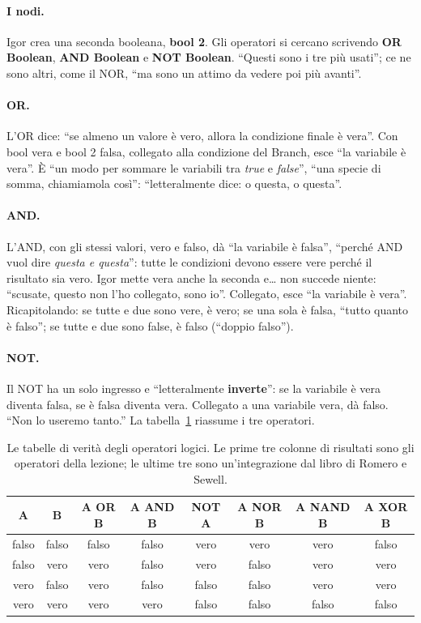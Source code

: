 \paragraph{I nodi.} Igor crea una seconda booleana, \textbf{bool 2}. Gli operatori si
cercano scrivendo \textbf{OR Boolean}, \textbf{AND Boolean} e \textbf{NOT Boolean}.
``Questi sono i tre più usati''; ce ne sono altri, come il NOR, ``ma sono un attimo da
vedere poi più avanti''.

\paragraph{OR.} L'OR dice: ``se almeno un valore è vero, allora la condizione finale è
vera''. Con bool vera e bool 2 falsa, collegato alla condizione del Branch, esce ``la
variabile è vera''. È ``un modo per sommare le variabili tra \emph{true} e \emph{false}'',
``una specie di somma, chiamiamola così'': ``letteralmente dice: o questa, o questa''.

\paragraph{AND.} L'AND, con gli stessi valori, vero e falso, dà ``la variabile è falsa'',
``perché AND vuol dire \emph{questa e questa}'': tutte le condizioni devono essere vere
perché il risultato sia vero. Igor mette vera anche la seconda e\ldots{} non succede
niente: ``scusate, questo non l'ho collegato, sono io''. Collegato, esce ``la variabile è
vera''. Ricapitolando: se tutte e due sono vere, è vero; se una sola è falsa, ``tutto
quanto è falso''; se tutte e due sono false, è falso (``doppio falso'').

\paragraph{NOT.} Il NOT ha un solo ingresso e ``letteralmente \textbf{inverte}'': se la
variabile è vera diventa falsa, se è falsa diventa vera. Collegato a una variabile vera,
dà falso. ``Non lo useremo tanto.'' La tabella~\ref{ue2:tab:logici} riassume i tre
operatori.

\begin{table}[htbp]
\centering
\small
\begin{tabular}{@{}cc|ccc|ccc@{}}
\toprule
\textbf{A} & \textbf{B} & \textbf{A OR B} & \textbf{A AND B} & \textbf{NOT A} &
  \textbf{A NOR B} & \textbf{A NAND B} & \textbf{A XOR B} \\
\midrule
falso & falso & falso & falso & vero  & vero  & vero  & falso \\
falso & vero  & vero  & falso & vero  & falso & vero  & vero  \\
vero  & falso & vero  & falso & falso & falso & vero  & vero  \\
vero  & vero  & vero  & vero  & falso & falso & falso & falso \\
\bottomrule
\end{tabular}
\caption{Le tabelle di verità degli operatori logici. Le prime tre colonne di risultati
sono gli operatori della lezione; le ultime tre sono un'integrazione dal libro di Romero
e Sewell.}
\label{ue2:tab:logici}
\end{table}

